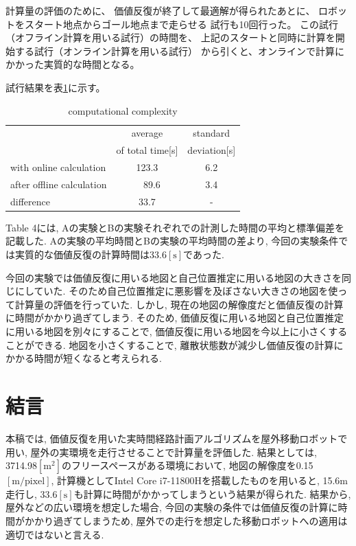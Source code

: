 \documentclass{jarticle}
\begin{document}
計算量の評価のために、
価値反復が終了して最適解が得られたあとに、
ロボットをスタート地点からゴール地点まで走らせる
試行も10回行った。
この試行（オフライン計算を用いる試行）の時間を、
上記のスタートと同時に計算を開始する試行（オンライン計算を用いる試行）
から引くと、オンラインで計算にかかった実質的な時間となる。

試行結果を表\ref{table:result}に示す。


\begin{table}[hbtp]
	\caption{computational complexity}
	\label{table:result}
	\centering
	\begin{small}
	 \begin{tabular}{l|cc}
		\hline
		 & average & standard \\
		 & of total time[s] & deviation[s] \\
		\hline \hline
		with online calculation & 123.3 & 6.2 \\
		after offline calculation &\ \ 89.6 & 3.4 \\
		\hline
		 difference & 33.7 & - \\
		\hline
	 \end{tabular}
	\end{small}
 \end{table}

Table 4には, Aの実験とBの実験それぞれでの計測した時間の平均と標準偏差を記載した. 
Aの実験の平均時間とBの実験の平均時間の差より, 今回の実験条件では実質的な価値反復の計算時間は33.6$\mathrm{[s]}$であった.

今回の実験では価値反復に用いる地図と自己位置推定に用いる地図の大きさを同じにしていた. 
そのため自己位置推定に悪影響を及ぼさない大きさの地図を使って計算量の評価を行っていた. 
しかし, 現在の地図の解像度だと価値反復の計算に時間がかかり過ぎてしまう. 
そのため, 価値反復に用いる地図と自己位置推定に用いる地図を別々にすることで, 価値反復に用いる地図を今以上に小さくすることができる. 
地図を小さくすることで, 離散状態数が減少し価値反復の計算にかかる時間が短くなると考えられる. 
\section{結言}%
本稿では, 価値反復を用いた実時間経路計画アルゴリズムを屋外移動ロボットで用い, 屋外の実環境を走行させることで計算量を評価した. 
結果としては, 3714.98$\mathrm{[m^2]}$のフリースペースがある環境において, 
地図の解像度を0.15$\mathrm{[m/pixel]}$, 計算機としてIntel Core i7-11800Hを搭載したものを用いると, 
15.6$\mathrm{m}$走行し, 33.6$\mathrm{[s]}$も計算に時間がかかってしまうという結果が得られた. 
結果から, 屋外などの広い環境を想定した場合, 今回の実験の条件では価値反復の計算に時間がかかり過ぎてしまうため, 
屋外での走行を想定した移動ロボットへの適用は適切ではないと言える.
\end{document}
